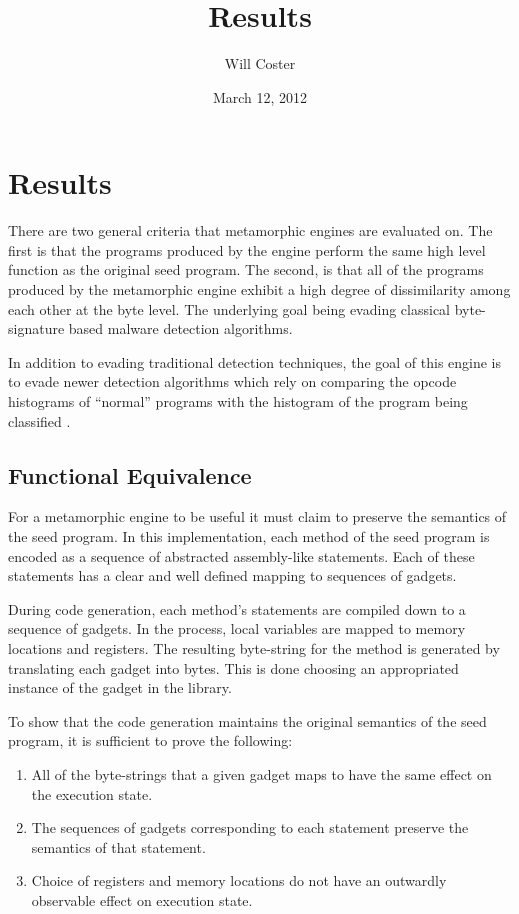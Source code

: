 \documentclass[finalcopy,short]{srpaper}
\title{Results}
\author{Will Coster}
\date{March 12, 2012}
\begin{document}
    \frontmatter

    \chapter{Results}

        There are two general criteria that metamorphic engines are evaluated
        on. The first is that the programs produced by the engine perform the
        same high level function as the original seed program. The second, is
        that all of the programs produced by the metamorphic engine exhibit a
        high degree of dissimilarity among each other at the byte level. The
        underlying goal being evading classical byte-signature based malware
        detection algorithms.

        In addition to evading traditional detection techniques, the goal of
        this engine is to evade newer detection algorithms which rely on
        comparing the opcode histograms of ``normal'' programs with the
        histogram of the program being classified \cite{histogram}.

    \section{Functional Equivalence}

        For a metamorphic engine to be useful it must claim to preserve the
        semantics of the seed program. In this implementation, each method of
        the seed program is encoded as a sequence of abstracted assembly-like
        statements. Each of these statements has a clear and well defined
        mapping to sequences of gadgets.
        
        During code generation, each method's statements are compiled down to a
        sequence of gadgets. In the process, local variables are mapped to
        memory locations and registers. The resulting byte-string for the method
        is generated by translating each gadget into bytes. This is done
        choosing an appropriated instance of the gadget in the library.

        To show that the code generation maintains the original semantics of the
        seed program, it is sufficient to prove the following:

        \begin{enumerate}

            \item All of the byte-strings that a given gadget maps to have the
                same effect on the execution state.

            \item The sequences of gadgets corresponding to each statement
                preserve the semantics of that statement.

            \item Choice of registers and memory locations do not have an
                outwardly observable effect on execution state.

        \end{enumerate}
\end{document}
